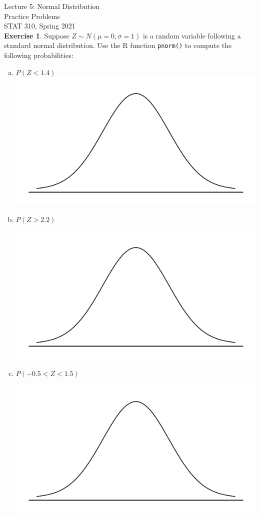 \documentclass[11pt]{article}\usepackage[]{graphicx}\usepackage[]{color}
\begin{document}
\setlength\parindent{0pt}

Lecture 5: Normal Distribution\\
Practice Problems\\
STAT 310, Spring 2021\\

\textbf{Exercise 1}.  Suppose $Z \sim N(\mu = 0, \sigma = 1)$ is a random variable following a standard normal distribution.  Use the R function \texttt{pnorm()} to compute the following probabilities:
\begin{enumerate}[(a)]
\item $P(Z < 1.4)$\\

\includegraphics[scale=0.5]{figure/norm_draw.pdf}
\bigskip

\item $P(Z > 2.2)$

\includegraphics[scale=0.5]{figure/norm_draw.pdf}
\bigskip

\item $P(-0.5 < Z < 1.5)$

\includegraphics[scale=0.5]{figure/norm_draw.pdf}
\bigskip
\end{enumerate}
\end{document}
